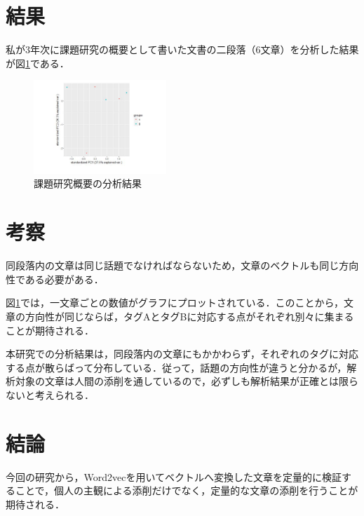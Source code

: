 \documentclass[uplatex,twocolumn,dvipdfmx]{jsarticle}
\begin{document}
\section{結果}
私が3年次に課題研究の概要として書いた文書の二段落（6文章）を分析した結果が図\ref{分析結果}である．
\begin{figure}[h]
\centering
\includegraphics[width=5cm]{02.pdf}
\caption{課題研究概要の分析結果}\label{分析結果}
\end{figure}

\section{考察}

同段落内の文章は同じ話題でなければならないため，文章のベクトルも同じ方向性である必要がある．

図\ref{分析結果}では，一文章ごとの数値がグラフにプロットされている．このことから，文章の方向性が同じならば，タグAとタグBに対応する点がそれぞれ別々に集まることが期待される．

本研究での分析結果は，同段落内の文章にもかかわらず，それぞれのタグに対応する点が散らばって分布している．従って，話題の方向性が違うと分かるが，解析対象の文章は人間の添削を通しているので，必ずしも解析結果が正確とは限らないと考えられる．

\section{結論}

今回の研究から，Word2vecを用いてベクトルへ変換した文章を定量的に検証することで，個人の主観による添削だけでなく，定量的な文章の添削を行うことが期待される．


\end{document}
